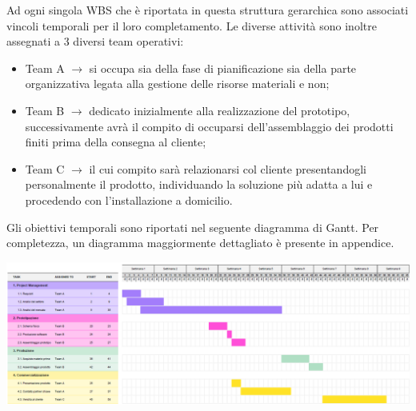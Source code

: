 \documentclass[a4paper, 12pt]{article}
\begin{document}
	Ad ogni singola WBS che è riportata in questa struttura gerarchica sono associati vincoli temporali per il loro completamento. Le diverse attività sono inoltre assegnati a 3 diversi team operativi:
	\begin{itemize}
		\item Team A $\rightarrow$ si occupa sia della fase di pianificazione sia della parte organizzativa legata alla gestione delle risorse materiali e non;
		\item Team B $\rightarrow$ dedicato inizialmente alla realizzazione del prototipo, successivamente avrà il compito di occuparsi dell'assemblaggio dei prodotti finiti prima della consegna al cliente;
		\item Team C $\rightarrow$ il cui compito sarà relazionarsi col cliente presentandogli personalmente il prodotto, individuando la soluzione più adatta a lui e procedendo con l'installazione a domicilio.
	\end{itemize}
	Gli obiettivi temporali sono riportati nel seguente diagramma di Gantt. Per completezza, un diagramma maggiormente dettagliato è presente in appendice.
	\begin{center}
		\includegraphics[width=\textwidth]{Images/gantt.png}
	\end{center}
	\newpage
\end{document}
